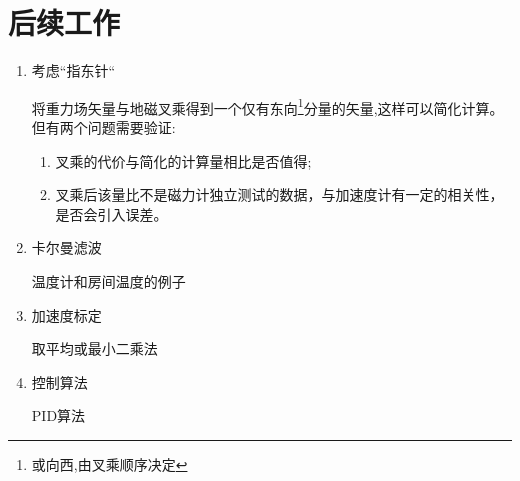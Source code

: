 \documentclass[12pt,a4paper]{article}
\begin{document}
\section{后续工作}
\begin{enumerate}
    \item 考虑“指东针“

        将重力场矢量与地磁叉乘得到一个仅有东向\footnote{或向西,由叉乘顺序决定}分量的矢量,这样可以简化计算。但有两个问题需要验证:
        \begin{enumerate}
            \item 叉乘的代价与简化的计算量相比是否值得;
            \item 叉乘后该量比不是磁力计独立测试的数据，与加速度计有一定的相关性，是否会引入误差。
        \end{enumerate} 
    \item 卡尔曼滤波

        温度计和房间温度的例子
    \item 加速度标定

        取平均或最小二乘法
    \item 控制算法

        PID算法
\end{enumerate}

\newpage
\renewcommand\refname{参考文献}
\centering %


\end{document}
